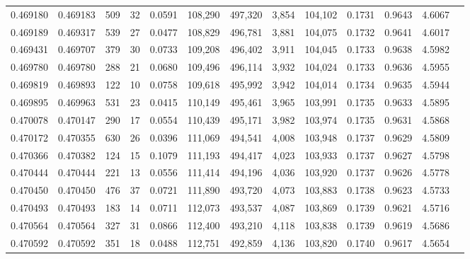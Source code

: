 \begin{tabular}{rrrrrrrrrrrrr}
0.469180 & 0.469183 &   509 &    32 &                                     0.0591 & 108,290 & 497,320 &   3,854 & 104,102 & 0.1731 & 0.9643 & 4.6067 \\
0.469189 & 0.469317 &   539 &    27 &                                     0.0477 & 108,829 & 496,781 &   3,881 & 104,075 & 0.1732 & 0.9641 & 4.6017 \\
0.469431 & 0.469707 &   379 &    30 &                                     0.0733 & 109,208 & 496,402 &   3,911 & 104,045 & 0.1733 & 0.9638 & 4.5982 \\
0.469780 & 0.469780 &   288 &    21 &                                     0.0680 & 109,496 & 496,114 &   3,932 & 104,024 & 0.1733 & 0.9636 & 4.5955 \\
0.469819 & 0.469893 &   122 &    10 &                                     0.0758 & 109,618 & 495,992 &   3,942 & 104,014 & 0.1734 & 0.9635 & 4.5944 \\
0.469895 & 0.469963 &   531 &    23 &                                     0.0415 & 110,149 & 495,461 &   3,965 & 103,991 & 0.1735 & 0.9633 & 4.5895 \\
0.470078 & 0.470147 &   290 &    17 &                                     0.0554 & 110,439 & 495,171 &   3,982 & 103,974 & 0.1735 & 0.9631 & 4.5868 \\
0.470172 & 0.470355 &   630 &    26 &                                     0.0396 & 111,069 & 494,541 &   4,008 & 103,948 & 0.1737 & 0.9629 & 4.5809 \\
0.470366 & 0.470382 &   124 &    15 &                                     0.1079 & 111,193 & 494,417 &   4,023 & 103,933 & 0.1737 & 0.9627 & 4.5798 \\
0.470444 & 0.470444 &   221 &    13 &                                     0.0556 & 111,414 & 494,196 &   4,036 & 103,920 & 0.1737 & 0.9626 & 4.5778 \\
0.470450 & 0.470450 &   476 &    37 &                                     0.0721 & 111,890 & 493,720 &   4,073 & 103,883 & 0.1738 & 0.9623 & 4.5733 \\
0.470493 & 0.470493 &   183 &    14 &                                     0.0711 & 112,073 & 493,537 &   4,087 & 103,869 & 0.1739 & 0.9621 & 4.5716 \\
0.470564 & 0.470564 &   327 &    31 &                                     0.0866 & 112,400 & 493,210 &   4,118 & 103,838 & 0.1739 & 0.9619 & 4.5686 \\
0.470592 & 0.470592 &   351 &    18 &                                     0.0488 & 112,751 & 492,859 &   4,136 & 103,820 & 0.1740 & 0.9617 & 4.5654 \\

\end{tabular}
